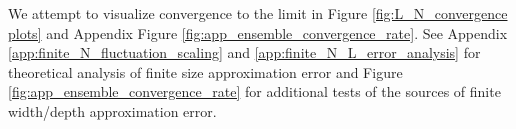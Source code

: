 \documentclass{article} %
\newcommand{\cp}[1]{\fTBD{{\textcolor{blue}[CP: #1]}}}
\begin{document}
We attempt to visualize convergence to the limit in Figure \ref{fig:L_N_convergence plots} and Appendix Figure \ref{fig:app_ensemble_convergence_rate}. %
See Appendix \ref{app:finite_N_fluctuation_scaling} and \ref{app:finite_N_L_error_analysis} for theoretical analysis of finite size approximation error and Figure \ref{fig:app_ensemble_convergence_rate} for additional tests of the sources of finite width/depth approximation error. 
\end{document}
